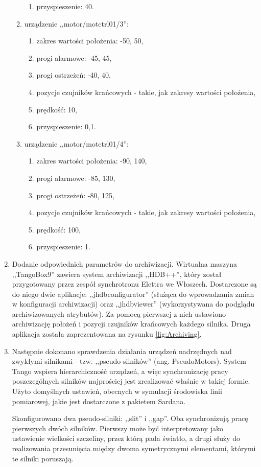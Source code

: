 \begin{enumerate}
\begin{enumerate}
\begin{enumerate}
			\item przyspieszenie: 40.
		\end{enumerate}
		\item urządzenie ,,motor/motctrl01/3'':
		\begin{enumerate}
			\item zakres wartości położenia: -50, 50,
			\item progi alarmowe: -45, 45,
			\item progi ostrzeżeń: -40, 40,
			\item pozycje czujników krańcowych - takie, jak zakresy wartości położenia,
			\item prędkość: 10,
			\item przyspieszenie: 0,1.
		\end{enumerate}
		\item urządzenie ,,motor/motctrl01/4'':
		\begin{enumerate}
			\item zakres wartości położenia: -90, 140,
			\item progi alarmowe: -85, 130,
			\item progi ostrzeżeń: -80, 125,
			\item pozycje czujników krańcowych - takie, jak zakresy wartości położenia,
			\item prędkość: 100,
			\item przyspieszenie: 1.
		\end{enumerate}
	\end{enumerate}
	
	\item Dodanie odpowiednich parametrów do archiwizacji. Wirtualna maszyna ,,TangoBox9'' zawiera system archiwizacji ,,HDB++'', który został przygotowany przez zespół synchrotronu Elettra we Włoszech. Dostarczone są do niego dwie aplikacje: ,,jhdbconfigurator'' (służąca do wprowadzania zmian w konfiguracji archiwizacji) oraz ,,jhdbviewer'' (wykorzystywana do podglądu archiwizowanych atrybutów). Za pomocą pierwszej z nich ustawiono archiwizację położeń i pozycji czujników krańcowych każdego silnika. Druga aplikacja została zaprezentowana na rysunku \ref{fig:Archiving}.
	
	\item Następnie dokonano sprawdzenia działania urządzeń nadrzędnych nad zwykłymi silnikami - tzw. ,,pseudo-silników'' (ang. PseudoMotors). System Tango wspiera hierarchiczność urządzeń, a więc synchronizację pracy poszczególnych silników najprościej jest zrealizować właśnie w takiej formie. Użyto domyślnych ustawień, obecnych w symulacji środowiska linii pomiarowej, jakie jest dostarczone z pakietem Sardana.
	
	Skonfigurowano dwa pseudo-silniki: ,,slit'' i ,,gap''. Oba synchronizują pracę pierwszych dwóch silników. Pierwszy może być interpretowany jako ustawienie wielkości szczeliny, przez którą pada światło, a drugi służy do realizowania przesunięcia między dwoma symetrycznymi elementami, którymi te silniki poruszają.
\end{enumerate}

